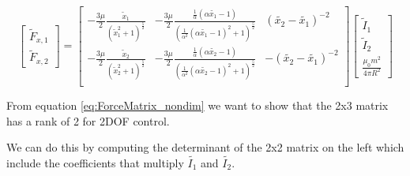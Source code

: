\documentclass[english]{article}
\begin{document}
\begin{equation}
\begin{bmatrix}
	\tilde{F}_{x,1}\\[0.3em]
	\tilde{F}_{x,2}	
\end{bmatrix}
=
\begin{bmatrix}
			-\frac{3\mu}{2} \frac{\tilde{x}_1}{\left(\tilde{x}_1^2 + 1 \right)^{\frac{5}{2}}}  & -\frac{3\mu}{2}\frac{\frac{1}{\alpha}\left(\alpha\tilde{x_1} - 1 \right)}{\left(\frac{1}{\alpha^2}\left(\alpha \tilde{x_1} - 1 \right)^2 + 1 \right)^{\frac{5}{2}}} & 	\left(\tilde{x_2}-\tilde{x_1}\right)^{-2}\\
			-\frac{3\mu}{2} \frac{\tilde{x}_2}{\left(\tilde{x}_2^2 + 1 \right)^{\frac{5}{2}}}  & -\frac{3\mu}{2}\frac{\frac{1}{\alpha}\left(\alpha\tilde{x_2} - 1 \right)}{\left(\frac{1}{\alpha^2}\left(\alpha \tilde{x_2} - 1 \right)^2 + 1 \right)^{\frac{5}{2}}} & 	-\left(\tilde{x_2}-\tilde{x_1}\right)^{-2}\\
\end{bmatrix}
\begin{bmatrix}
	\tilde{I}_1\\ \tilde{I}_2 \\ \frac{\mu_0 m^2}{4 \pi R^2}
\end{bmatrix}
\label{eq:ForceMatrix_nondim}
\end{equation}

From equation \ref{eq:ForceMatrix_nondim} we want to show that the 2x3 matrix has a rank of 2 for 2DOF control.

We can do this by computing the determinant of the 2x2 matrix on the left which include the coefficients that multiply $\tilde{I_1}$ and $\tilde{I_2}$.  
\end{document}
